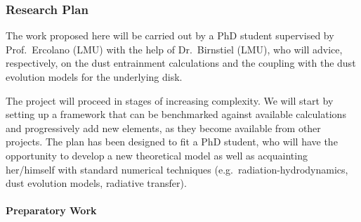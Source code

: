 \documentclass[10pt,fleqn,twoside]{article}
\begin{document}
\subsubsection{Research Plan} 

The work proposed here will be carried out by a PhD student supervised by
Prof.\ Ercolano (LMU) with the help of Dr.\ Birnstiel (LMU), who will
advice, respectively, on the dust entrainment calculations and the 
coupling with the dust evolution models for the underlying disk. 

The project will proceed in stages of increasing complexity. We will start
by setting up a framework that can be benchmarked against available
calculations and progressively add new elements, as they become
available from other projects. The plan has been designed to fit a
PhD student, who will have the opportunity to develop a new theoretical
model as well as acquainting her/himself with standard numerical
techniques (e.g.\ radiation-hydrodynamics, dust evolution models,
radiative transfer). 


\paragraph{Preparatory Work}
\end{document}
